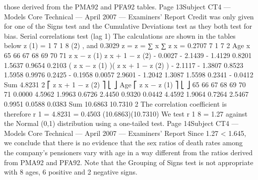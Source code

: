 \documentclass[a4paper,12pt]{article}
\begin{document}
those derived from the PMA92 and PFA92 tables.
Page 13Subject CT4 — Models Core Technical — April 2007 — Examiners’ Report
Credit was only given for one of the Signs test and the Cumulative Deviations
test as they both test for bias.
Serial correlations test (lag 1)
The calculations are shown in the tables below
z (1) =
1 7
1 8
(2)
,
and
0.3029
z
=
z
=
∑ x
∑ z x = 0.2707
7 1
7 2
Age x
65
66
67
68
69
70
71
z x − z (1)
z x + 1 − z (2)
- 0.0027
- 2.1439
- 1.4129
0.8201
1.5637
0.9654
0.2103
( z x − z (1) )( z x + 1 − z (2) )
- 2.1117
- 1.3807
0.8523
1.5958
0.9976
0.2425
- 0.1958
0.0057
2.9601
- 1.2042
1.3087
1.5598
0.2341
- 0.0412
Sum
4.8231
2
⎡ z x + 1 − z (2) ⎤
⎣
⎦
Age ⎡ z x − z (1) ⎤
⎣
⎦ 65
66
67
68
69
70
71 0.0000
4.5962
1.9963
0.6726
2.4450
0.9320
0.0442 4.4592
1.9064
0.7264
2.5467
0.9951
0.0588
0.0383
Sum 10.6863 10.7310
2
The correlation coefficient is therefore
r 1 =
4.8231
= 0.4503
(10.6863)(10.7310)
We test r 1 8 = 1.27 against the Normal (0,1) distribution using a one-tailed
test.
Page 14Subject CT4 — Models Core Technical — April 2007 — Examiners’ Report
Since 1.27 < 1.645, we conclude that there is no evidence that the sex ratios of
death rates among the company’s pensioners vary with age in a way different
from the ratios derived from PMA92 and PFA92.
Note that the Grouping of Signs test is not appropriate with 8 ages, 6 positive
and 2 negative signs.
\end{document}
